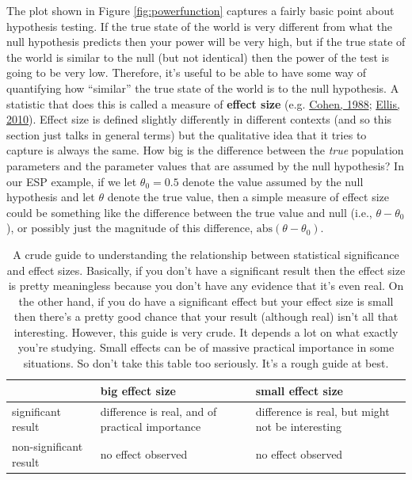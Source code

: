 \documentclass[
]{book}
\begin{document}
The plot shown in Figure \ref{fig:powerfunction} captures a fairly basic point about hypothesis testing. If the true state of the world is very different from what the null hypothesis predicts then your power will be very high, but if the true state of the world is similar to the null (but not identical) then the power of the test is going to be very low. Therefore, it's useful to be able to have some way of quantifying how ``similar'' the true state of the world is to the null hypothesis. A statistic that does this is called a measure of {\textbf{effect size}} (e.g. \protect\hyperlink{ref-Cohen1988}{Cohen, 1988}; \protect\hyperlink{ref-Ellis2010}{Ellis, 2010}). Effect size is defined slightly differently in different contexts (and so this section just talks in general terms) but the qualitative idea that it tries to capture is always the same. How big is the difference between the \emph{true} population parameters and the parameter values that are assumed by the null hypothesis? In our ESP example, if we let \(\theta_0 = 0.5\) denote the value assumed by the null hypothesis and let \(\theta\) denote the true value, then a simple measure of effect size could be something like the difference between the true value and null (i.e., \(\theta - \theta_0\)), or possibly just the magnitude of this difference, \(\mbox{abs}(\theta - \theta_0)\).

\begin{table}

\caption{\label{tab:unnamed-chunk-5}A crude guide to understanding the relationship between statistical significance and effect sizes. Basically, if you don't have a significant result then the effect size is pretty meaningless because you don't have any evidence that it's even real. On the other hand, if you do have a significant effect but your effect size is small then there's a pretty good chance that your result (although real) isn't all that interesting. However, this guide is very crude. It depends a lot on what exactly you're studying. Small effects can be of massive practical importance in some situations. So don't take this table too seriously. It's a rough guide at best.}
\centering
\begin{tabular}[t]{l|l|l}
\hline
 & big effect size & small effect size\\
\hline
significant result & difference is real, and  of practical importance & difference is real, but might not be interesting\\
\hline
non-significant result & no effect observed & no effect observed\\
\hline
\end{tabular}
\end{table}
\end{document}
